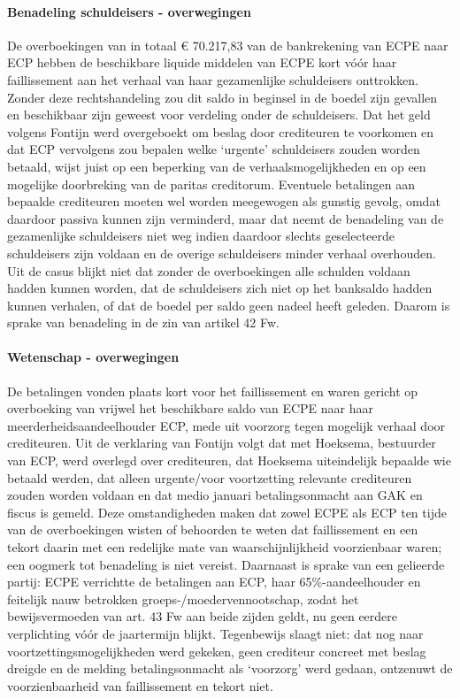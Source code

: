 \documentclass[
  dutch,
  a4paper,
]{article}
\begin{document}
\paragraph{Benadeling schuldeisers - overwegingen}\label{benadeling-schuldeisers---overwegingen-46}

De overboekingen van in totaal € 70.217,83 van de bankrekening van ECPE naar ECP hebben de beschikbare liquide middelen van ECPE kort vóór haar faillissement aan het verhaal van haar gezamenlijke schuldeisers onttrokken. Zonder deze rechtshandeling zou dit saldo in beginsel in de boedel zijn gevallen en beschikbaar zijn geweest voor verdeling onder de schuldeisers. Dat het geld volgens Fontijn werd overgeboekt om beslag door crediteuren te voorkomen en dat ECP vervolgens zou bepalen welke `urgente' schuldeisers zouden worden betaald, wijst juist op een beperking van de verhaalsmogelijkheden en op een mogelijke doorbreking van de paritas creditorum. Eventuele betalingen aan bepaalde crediteuren moeten wel worden meegewogen als gunstig gevolg, omdat daardoor passiva kunnen zijn verminderd, maar dat neemt de benadeling van de gezamenlijke schuldeisers niet weg indien daardoor slechts geselecteerde schuldeisers zijn voldaan en de overige schuldeisers minder verhaal overhouden. Uit de casus blijkt niet dat zonder de overboekingen alle schulden voldaan hadden kunnen worden, dat de schuldeisers zich niet op het banksaldo hadden kunnen verhalen, of dat de boedel per saldo geen nadeel heeft geleden. Daarom is sprake van benadeling in de zin van artikel 42 Fw.

\paragraph{Wetenschap - overwegingen}\label{wetenschap---overwegingen-46}

De betalingen vonden plaats kort voor het faillissement en waren gericht op overboeking van vrijwel het beschikbare saldo van ECPE naar haar meerderheidsaandeelhouder ECP, mede uit voorzorg tegen mogelijk verhaal door crediteuren. Uit de verklaring van Fontijn volgt dat met Hoeksema, bestuurder van ECP, werd overlegd over crediteuren, dat Hoeksema uiteindelijk bepaalde wie betaald werden, dat alleen urgente/voor voortzetting relevante crediteuren zouden worden voldaan en dat medio januari betalingsonmacht aan GAK en fiscus is gemeld. Deze omstandigheden maken dat zowel ECPE als ECP ten tijde van de overboekingen wisten of behoorden te weten dat faillissement en een tekort daarin met een redelijke mate van waarschijnlijkheid voorzienbaar waren; een oogmerk tot benadeling is niet vereist. Daarnaast is sprake van een gelieerde partij: ECPE verrichtte de betalingen aan ECP, haar 65\%-aandeelhouder en feitelijk nauw betrokken groeps-/moedervennootschap, zodat het bewijsvermoeden van art. 43 Fw aan beide zijden geldt, nu geen eerdere verplichting vóór de jaartermijn blijkt. Tegenbewijs slaagt niet: dat nog naar voortzettingsmogelijkheden werd gekeken, geen crediteur concreet met beslag dreigde en de melding betalingsonmacht als `voorzorg' werd gedaan, ontzenuwt de voorzienbaarheid van faillissement en tekort niet.
\end{document}
